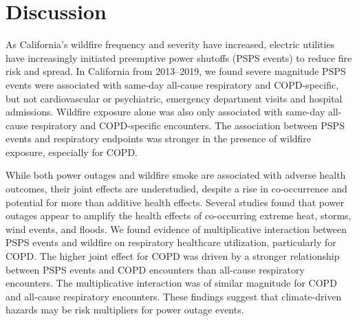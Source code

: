 \documentclass[../main.tex]{subfiles}
\begin{document}
\section{Discussion}

As California's wildfire frequency and severity have increased, electric utilities have increasingly initiated preemptive power shutoffs (PSPS events) to reduce fire risk and spread.\citep{huang2023review} In California from 2013--2019, we found severe magnitude PSPS events were associated with same-day all-cause respiratory and COPD-specific, but not cardiovascular or psychiatric, emergency department visits and hospital admissions. Wildfire \PM exposure alone was also only associated with same-day all-cause respiratory and COPD-specific encounters. The association between PSPS events and respiratory endpoints was stronger in the presence of wildfire \PM exposure, especially for COPD. 

While both power outages and wildfire smoke are associated with adverse health outcomes, their joint effects are understudied, despite a rise in co-occurrence\citep{do2025spatiotemporal} and potential for more than additive health effects. Several studies found that power outages appear to amplify the health effects of co-occurring extreme heat, storms, wind events, and floods.\citep{xu2025power, yamasaki2024heat, lin2011health, lin2021immediate, lin2024joint} We found evidence of multiplicative interaction between PSPS events and wildfire \PM on respiratory healthcare utilization, particularly for COPD. The higher joint effect for COPD was driven by a stronger relationship between PSPS events and COPD encounters than all-cause respiratory encounters. The multiplicative interaction was of similar magnitude for COPD and all-cause respiratory encounters. These findings suggest that climate-driven hazards may be risk multipliers for power outage events.
\end{document}

